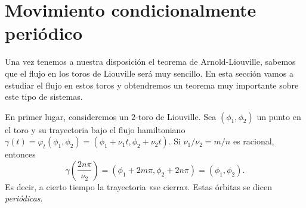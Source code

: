 \section{Movimiento condicionalmente periódico}\label{sec:promedios}
Una vez tenemos a nuestra disposición el teorema de Arnold-Liouville, sabemos que el flujo en los toros de Liouville será muy sencillo. En esta sección vamos a estudiar el flujo en estos toros y obtendremos un teorema muy importante sobre este tipo de sistemas.

  En primer lugar, consideremos un $2$-toro de Liouville. Sea $(\phi_1,\phi_2)$ un punto en el toro y su trayectoria bajo el flujo hamiltoniano $\gamma(t)=\varphi_t(\phi_1,\phi_2)=(\phi_1+\nu_1t,\phi_2+\nu_2t)$. Si $\nu_1/\nu_2=m/n$ es racional, entonces 
  \begin{equation*}
    \gamma\left(\frac{2n\pi}{\nu_2}\right) = (\phi_1+2m\pi,\phi_2+2n\pi)=(\phi_1,\phi_2).
  \end{equation*}
  Es decir, a cierto tiempo la trayectoria «se cierra». Estas órbitas se dicen \emph{periódicas}. 
 
